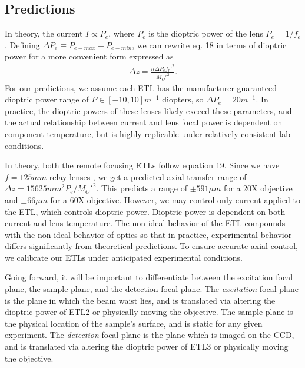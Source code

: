 \subsection{Predictions}
In theory, the current $I \propto P_e$, where $P_e$ is the dioptric power of the lens $P_e = 1/f_{e}$. Defining $\Delta P_e \equiv P_{e-max}-P_{e-min}$, we can rewrite eq. 18 in terms of dioptric power for a more convenient form expressed as
\begin{gather}
	\Delta z = \frac{n \Delta P_e f_r'^2}{M_O'^2}.
\end{gather}
For our predictions, we assume each ETL has the manufacturer-guaranteed dioptric power range of $P \in [-10, 10] m^{-1}$ diopters, so $\Delta P_e = 20 m^{-1}.$ In practice, the dioptric powers of these lenses likely exceed these parameters, and the actual relationship between current and lens focal power is dependent on component temperature, but is highly replicable under relatively consistent lab conditions.

\par In theory, both the remote focusing ETLs follow equation 19. Since we have $f=125mm$ relay lenses \cite{Liu}, we get a predicted axial transfer range of $\Delta z={15625mm^2P_e}/{M_O'^2}$. This predicts a range of $\pm 591 \mu m$ for a 20X objective and $\pm 66 \mu m$ for a 60X objective. However, we may control only current applied to the ETL, which controls dioptric power. Dioptric power is dependent on both current and lens temperature. The non-ideal behavior of the ETL compounds with the non-ideal behavior of optics so that in practice, experimental behavior differs significantly from theoretical predictions. To ensure accurate axial control, we calibrate our ETLs under anticipated experimental conditions.

\par Going forward, it will be important to differentiate between the excitation focal plane, the sample plane, and the detection focal plane. The \textit{excitation} focal plane is the plane in which the beam waist lies, and is translated via altering the dioptric power of ETL2 or physically moving the objective. The sample plane is the physical location of the sample's surface, and is static for any given experiment. The \textit{detection} focal plane is the plane which is imaged on the CCD, and is translated via altering the dioptric power of ETL3 or physically moving the objective.


